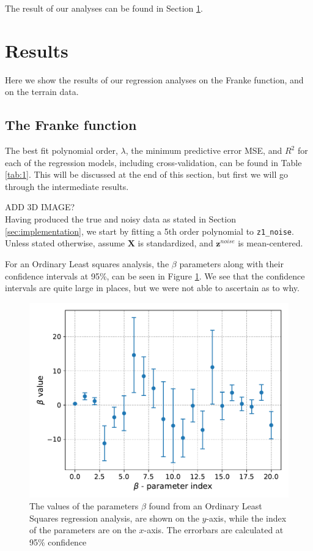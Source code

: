 \documentclass[a4paper,10pt,english]{article}
\def\code#1{\texttt{#1}} %
\begin{document}
The result of our analyses can be found in Section \ref{sec:results}.
%
%
\section{Results}\label{sec:results}
Here we show the results of our regression analyses on the Franke function, and on the terrain data.

\subsection{The Franke function}
The best fit polynomial order, $\lambda$, the minimum predictive error MSE, and $R^2$ for each of the regression models, including cross-validation, can be found in Table \ref{tab:1}. This will be discussed at the end of this section, but first we will go through the intermediate results.

ADD 3D IMAGE?\\\newline
Having produced the true and noisy data as stated in Section \ref{sec:implementation}, we start by fitting a 5th order polynomial to \code{z1\_noise}. Unless stated otherwise, assume $\bm{X}$ is standardized, and $\bm{z}^{noise}$ is mean-centered.

For an Ordinary Least squares analysis, the $\beta$ parameters along with their confidence intervals at 95\%, can be seen in Figure \ref{fig:1}. We see that the confidence intervals are quite large in places, but we were not able to ascertain as to why.

\begin{figure}[H]
	\centering
	\includegraphics[scale=0.6]{a_CI_betaOLS_st_wb0.pdf}
\caption{The values of the parameters $\beta$ found from an Ordinary Least Squares regression analysis, are shown on the $y$-axis, while the index of the parameters are on the $x$-axis. The errorbars are calculated at 95\% confidence}
	\label{fig:1}
\end{figure}
\end{document}
